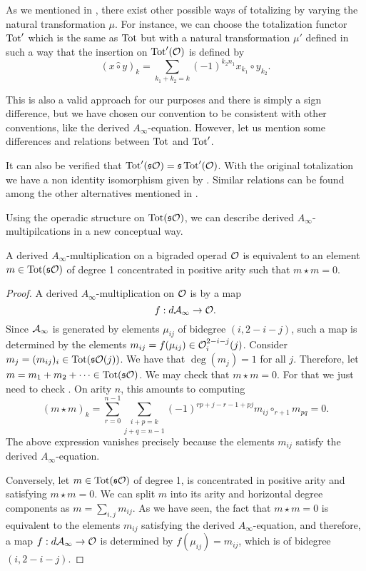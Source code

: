\documentclass[Thesis.tex]{subfiles}
\begin{document}
\begin{remark}\label{othermu}


As we mentioned in , there exist other possible ways of totalizing by varying the natural transformation $\mu$. For instance, we can choose the totalization functor $\operatorname{Tot}'$ which is the same as $\operatorname{Tot}$ but with a natural transformation $\mu'$ defined in such a way that the insertion on $\operatorname{Tot}'({\mathcal O})$ is defined by \[(x\hat{\circ}y)_k=\sum_{k_1+k_2=k}(-1)^{k_2n_1}x_{k_1}\circ y_{k_2}.\] 

This is also a valid approach for our purposes and there is simply a sign difference, but we have chosen our convention to be consistent with other conventions, like the derived $A_\infty$-equation. However, let us mention some differences and relations between $\operatorname{Tot}$ and $\operatorname{Tot}'$. 

It can also be verified that $\operatorname{Tot}'(\mathfrak{s}{\mathcal O})=\mathfrak{s} \operatorname{Tot}'({\mathcal O})$. With the original totalization we have a non identity isomorphism given by . Similar relations can be found among the other alternatives mentioned in . %



\end{remark}


Using the operadic structure on $\operatorname{Tot}(\mathfrak{s}{\mathcal O})$, we can describe derived $A_\infty$-multipilcations in a new conceptual way.

\begin{lem}\label{mstar}
A derived $A_\infty$-multiplication on a bigraded operad ${\mathcal O}$ is equivalent to an element $m\in\operatorname{Tot}(\mathfrak{s}{\mathcal O})$ of degree 1 concentrated in positive arity such that $m\star m = 0$. 
\end{lem}
\begin{proof}
A derived $A_\infty$-multiplication on ${\mathcal O}$ is by  a map 
\[f:d\mathcal{A}_\infty\to{\mathcal O}.\]
Since $\mathcal{A}_\infty$ is generated by elements $\mu_{ij}$ of bidegree $(i,2-i-j)$, such a map is determined by the elements $m_{ij}=f(\mu_{ij})\in{\mathcal O}^{2-i-j}_i(j)$. Consider $m_j = (m_{ij})_i\in\operatorname{Tot}(\mathfrak{s}{\mathcal O}(j))$. We have that $\deg(m_j)=1$ for all $j$. Therefore, let $m=m_1+m_2+\cdots\in\operatorname{Tot}(\mathfrak{s}{\mathcal O})$. We may check that $m\star m=0$. For that we just need to check . On arity $n$, this amounts to computing
\[(m\star m)_k = \sum_{r=0}^{n-1}\underset{j+q=n-1}{\sum_{i+p=k}}(-1)^{rp+j-r-1+ pj}m_{ij}\circ_{r+1}m_{pq}=0.\]
The above expression vanishes precisely because the elements $m_{ij}$ satisfy the derived $A_\infty$-equation.

Conversely, let $m\in\operatorname{Tot}(\mathfrak{s}{\mathcal O})$ of degree 1, is concentrated in positive arity and satisfying $m\star m=0$. We can split $m$ into its arity and horizontal degree components as $m=\sum_{i,j}m_{ij}$. As we have seen, the fact that $m\star m=0$ is equivalent to the elements $m_{ij}$ satisfying the derived $A_\infty$-equation, and therefore, a map $f:d\mathcal{A}_\infty\to{\mathcal O}$ is determined by $f(\mu_{ij})=m_{ij}$, which is of bidegree $(i,2-i-j)$. 
\end{proof}
\end{document}
